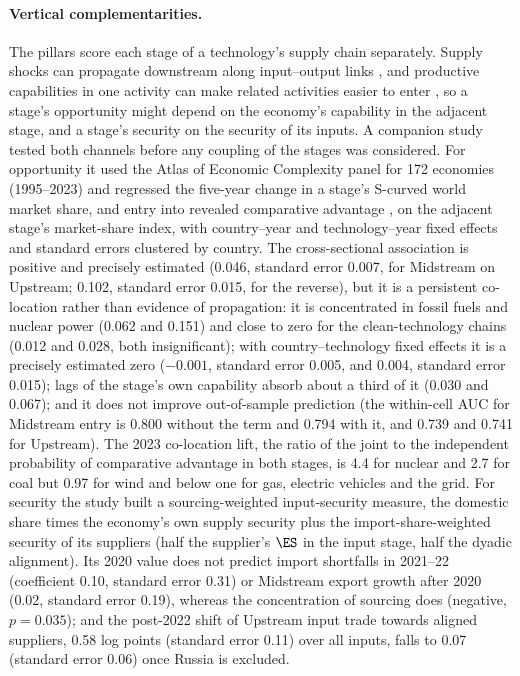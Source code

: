 

\paragraph{Vertical complementarities.} The pillars score each stage of a technology's supply
chain separately. Supply shocks can propagate downstream along input--output links
\citep{acemoglu2012network, baqaee2019macroeconomic, carvalho2021supply}, and productive
capabilities in one activity can make related activities easier to enter
\citep{hidalgo2007product}, so a stage's opportunity might depend on the economy's capability in
the adjacent stage, and a stage's security on the security of its inputs. A companion study
tested both channels before any coupling of the stages was considered. For opportunity it used
the Atlas of Economic Complexity panel for 172 economies (1995--2023) and regressed the
five-year change in a stage's S-curved world market share, and entry into revealed comparative
advantage \citep{balassa1965trade}, on the adjacent stage's market-share index, with
country--year and technology--year fixed effects and standard errors clustered by country. The
cross-sectional association is positive and precisely estimated (0.046, standard error 0.007,
for Midstream on Upstream; 0.102, standard error 0.015, for the reverse), but it is a persistent
co-location rather than evidence of propagation: it is concentrated in fossil fuels and nuclear
power (0.062 and 0.151) and close to zero for the clean-technology chains (0.012 and 0.028, both
insignificant); with country--technology fixed effects it is a precisely estimated zero
($-0.001$, standard error 0.005, and 0.004, standard error 0.015); lags of the stage's own
capability absorb about a third of it (0.030 and 0.067); and it does not improve out-of-sample
prediction (the within-cell AUC for Midstream entry is 0.800 without the term and 0.794 with it,
and 0.739 and 0.741 for Upstream). The 2023 co-location lift, the ratio of the joint to the
independent probability of comparative advantage in both stages, is 4.4 for nuclear and 2.7 for
coal but 0.97 for wind and below one for gas, electric vehicles and the grid. For security the
study built a sourcing-weighted input-security measure, the domestic share times the economy's
own supply security plus the import-share-weighted security of its suppliers (half the
supplier's $\ES$ in the input stage, half the dyadic alignment). Its 2020 value does not predict
import shortfalls in 2021--22 (coefficient 0.10, standard error 0.31) or Midstream export growth
after 2020 (0.02, standard error 0.19), whereas the concentration of sourcing does (negative,
$p=0.035$); and the post-2022 shift of Upstream input trade towards aligned suppliers, 0.58 log
points (standard error 0.11) over all inputs, falls to 0.07 (standard error 0.06) once Russia
is excluded.

